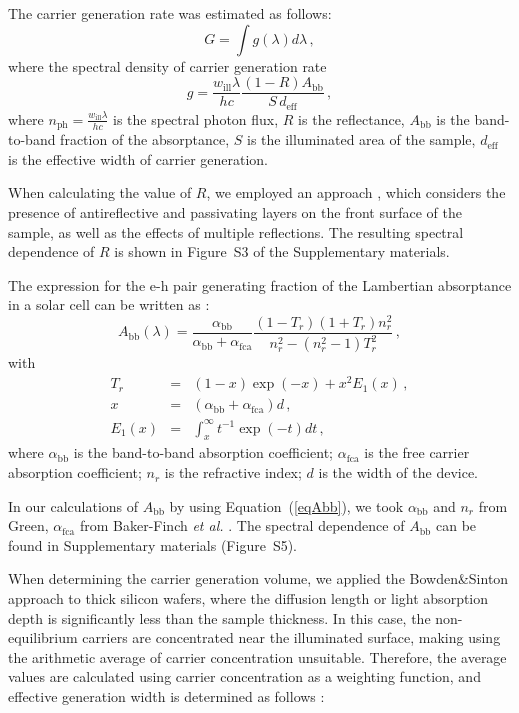 \documentclass{WileyMSP-template}
\begin{document}
The carrier generation rate was estimated as follows:
\begin{equation}
\label{eqGint}
G=\int g(\lambda) d\lambda\,,
\end{equation}
where the spectral density of carrier generation rate
\begin{equation}
\label{eqGspectr}
g=\frac{w_\mathrm{ill}\lambda}{hc}\frac{(1-R)A_\mathrm{bb}}{S\,d_\mathrm{eff}}\,,
\end{equation}
where $n_\mathrm{ph}=\frac{w_\mathrm{ill}\lambda}{hc}$ is the spectral photon flux,
$R$ is the reflectance,
$A_\mathrm{bb}$ is the band-to-band fraction of the absorptance,
$S$ is the illuminated area of the sample,
$d_\mathrm{eff}$ is the effective width of carrier generation.

When calculating the value of $R$, we employed an approach \cite{KostRefl2000},
which considers the presence of antireflective and passivating layers on the front surface of the sample,
as well as the effects of multiple reflections.
The resulting spectral dependence of $R$ is shown in Figure~S3 of the Supplementary materials.

The expression for the e-h pair generating fraction of the Lambertian absorptance in a solar cell
can be written as \cite{Schaefer2018}:
\begin{equation}
\label{eqAbb}
A_\mathrm{bb}(\lambda)=\frac{\alpha_\mathrm{bb}}{\alpha_\mathrm{bb}+\alpha_\mathrm{fca}}\frac{(1-T_r)(1+T_r)n_r^2}{n_r^2-(n_r^2-1)T_r^2}\,,
\end{equation}
with
\begin{eqnarray*}
T_r&=&(1-x)\exp(-x)+x^2E_1(x)\,,\\
x&=&(\alpha_\mathrm{bb}+\alpha_\mathrm{fca})d\,,\\
E_1(x)&=&\int_x^\infty t^{-1}\exp(-t)dt\,,
\end{eqnarray*}
where
$\alpha_\mathrm{bb}$ is the band-to-band absorption coefficient;
$\alpha_\mathrm{fca}$ is the free carrier absorption coefficient;
$n_r$ is the refractive index;
$d$ is the width of the device.

In our calculations of $A_\mathrm{bb}$ by using Equation~(\ref{eqAbb}), we took  $\alpha_\mathrm{bb}$ and
$n_r$ from Green\cite{Green2022}, $\alpha_\mathrm{fca}$  from Baker-Finch \emph{et al.} \cite{SiFCA}.
The spectral dependence of $A_\mathrm{bb}$ can be found in Supplementary materials (Figure~S5).

When determining the carrier generation volume, we applied the Bowden\&Sinton  approach \cite{Bowden2007} to thick silicon wafers,
where the diffusion length or light absorption depth is significantly less than the sample thickness.
In this case, the non-equilibrium carriers are concentrated near the illuminated surface,
making using the arithmetic average of carrier concentration unsuitable.
Therefore, the average values are calculated using carrier concentration as a weighting function,
and effective generation width is determined as follows \cite{Bowden2007}:
\end{document}
